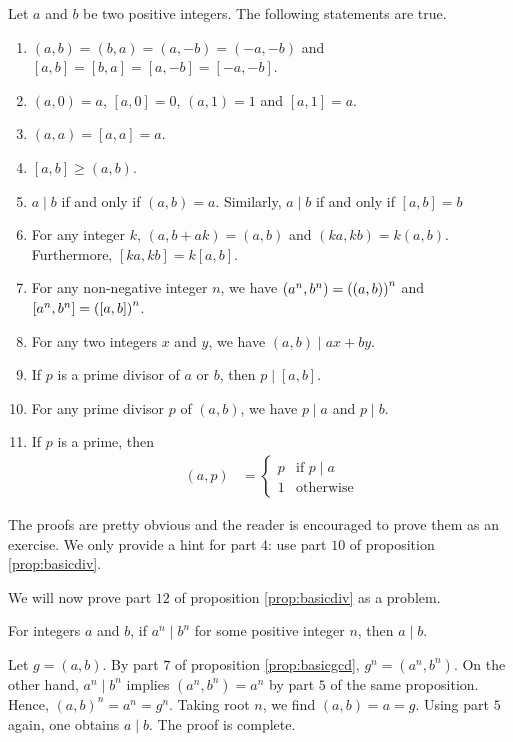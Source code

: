 \begin{proposition}\label{prop:basicgcd}
	Let $a$ and $b$ be two positive integers. The following statements are true.
	\begin{enumerate}
		\item 	$(a, b) = (b, a) = (a, -b) = (-a, -b)$ and $[a, b]=[b, a] = [a, -b] = [-a, -b]$.
		\item 	$(a,0)=a$, $[a,0]=0$, $(a,1)=1$ and $[a,1]=a$.
		\item 	$(a,a)=[a,a] = a$.
		\item   $[a,b] \geq (a,b)$.
		\item	$a\mid b$ if and only if $(a,b)=a$. Similarly, $a\mid b$ if and only if $[a,b]=b$
		\item   For any integer $k$, $ (a, b+ak) = (a, b)$ and $(ka,kb)=k(a,b)$. Furthermore, $[ka,kb]=k[a,b]$.
		\item   For any non-negative integer $n$, we have $(a^n,b^n)=\left((a,b)\right)^n$ and $[a^n,b^n]=\left([a,b]\right)^n$.
		\item 	For any two integers $x$ and $y$, we have $(a,b)\mid ax+by$.
		\item 	If $p$ is a prime divisor of $a$ or $b$, then $p\mid [a,b]$.
		\item 	For any prime divisor $p$ of $(a, b)$, we have $p\mid a$ and $p\mid b$.
		\item 	If $p$ is a prime, then
		\begin{align*}
			(a,p) & =
			\begin{cases}
				p & \mbox{if } p\mid a\\
				1 & \mbox{otherwise}
			\end{cases}
		\end{align*}
	\end{enumerate}
\end{proposition}

The proofs are pretty obvious and the reader is encouraged to prove them as an exercise. We only provide a hint for part $4$: use part $10$ of proposition \eqref{prop:basicdiv}.

We will now prove part $12$ of proposition \eqref{prop:basicdiv} as a problem.

\begin{problem}
	For integers $a$ and $b$, if $a^n \mid b^n$ for some positive integer $n$, then $a\mid b$.
\end{problem}

\begin{solution}
	Let $g=(a,b)$. By part $7$ of proposition \eqref{prop:basicgcd}, $g^n = (a^n,b^n)$. On the other hand, $a^n\mid b^n$ implies $(a^n, b^n)=a^n$ by part $5$ of the same proposition. Hence, $(a, b)^n=a^n=g^n$. Taking root $n$, we find $(a,b)=a=g$. Using part $5$ again, one obtains $a\mid b$. The proof is complete.

\end{solution}

